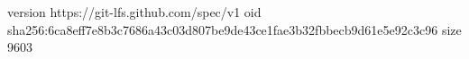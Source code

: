 version https://git-lfs.github.com/spec/v1
oid sha256:6ca8eff7e8b3c7686a43c03d807be9de43ce1fae3b32fbbecb9d61e5e92c3c96
size 9603
